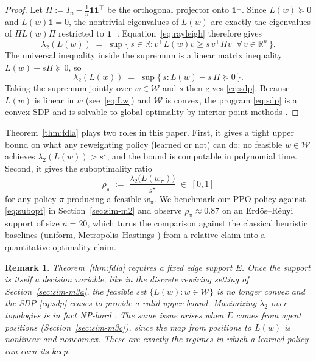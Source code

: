 \documentclass[letterpaper, 11 pt, journal, twoside]{IEEEtran}
\newcommand{\R}{\mathbb{R}}
\newtheorem{remark}{Remark}
\begin{document}
\begin{proof}
Let $\Pi := I_n - \tfrac{1}{n}\mathbf{1}\mathbf{1}^\top$ be the
orthogonal projector onto $\mathbf{1}^\perp$. Since $L(w) \succeq 0$
and $L(w)\mathbf{1} = 0$, the nontrivial eigenvalues of $L(w)$ are
exactly the eigenvalues of $\Pi L(w) \Pi$ restricted to
$\mathbf{1}^\perp$. Equation~\eqref{eq:rayleigh} therefore gives
\[
\lambda_2(L(w)) \;=\; \sup\{\, s \in \R : v^\top L(w) v \ge s\, v^\top \Pi v
\;\; \forall\, v \in \R^n \,\}.
\]
The universal inequality inside the supremum is a linear matrix
inequality $L(w) - s\Pi \succeq 0$, so
\[
\lambda_2(L(w)) \;=\; \sup\{\, s : L(w) - s\,\Pi \succeq 0 \,\}.
\]
Taking the supremum jointly over $w \in \mathcal{W}$ and $s$ then
gives \eqref{eq:sdp}. Because $L(w)$ is linear in $w$
(see~\eqref{eq:Lw}) and $\mathcal{W}$ is convex, the program
\eqref{eq:sdp} is a convex SDP and is solvable to global optimality
by interior-point methods
\cite{BoydVandenberghe2004,XiaoBoyd2004}.
\end{proof}

Theorem~\ref{thm:fdla} plays two roles in this paper. First, it
gives a tight upper bound on what any reweighting policy (learned or
not) can do: no feasible $w \in \mathcal{W}$ achieves
$\lambda_2(L(w)) > s^\star$, and the bound is computable in
polynomial time. Second, it gives the suboptimality ratio
\begin{equation}
\rho_\pi \;:=\; \frac{\lambda_2\!\big(L(w_\pi)\big)}{s^\star}
\;\in\; [0, 1]
\label{eq:subopt}
\end{equation}
for any policy $\pi$ producing a feasible $w_\pi$. We benchmark our
PPO policy against \eqref{eq:subopt} in Section~\ref{sec:sim-m2}
and observe $\rho_\pi \approx 0.87$ on an Erd\H{o}s--R\'enyi support
of size $n = 20$, which turns the comparison against the classical
heuristic baselines (uniform, Metropolis--Hastings
\cite{XiaoBoyd2004,Boyd2004}) from a relative claim into a
quantitative optimality claim.

\begin{remark}
Theorem~\ref{thm:fdla} requires a fixed edge support $E$. Once the
support is itself a decision variable, like in the discrete rewiring
setting of Section~\ref{sec:sim-m3a}, the feasible set
$\{L(w) : w \in \mathcal{W}\}$ is no longer convex and the SDP
\eqref{eq:sdp} ceases to provide a valid upper bound. Maximizing
$\lambda_2$ over topologies is in fact NP-hard \cite{Mosk2006}. The
same issue arises when $E$ comes from agent positions
(Section~\ref{sec:sim-m3c}), since the map from positions to $L(w)$
is nonlinear and nonconvex. These are exactly the regimes in which a
learned policy can earn its keep.
\end{remark}
\end{document}
